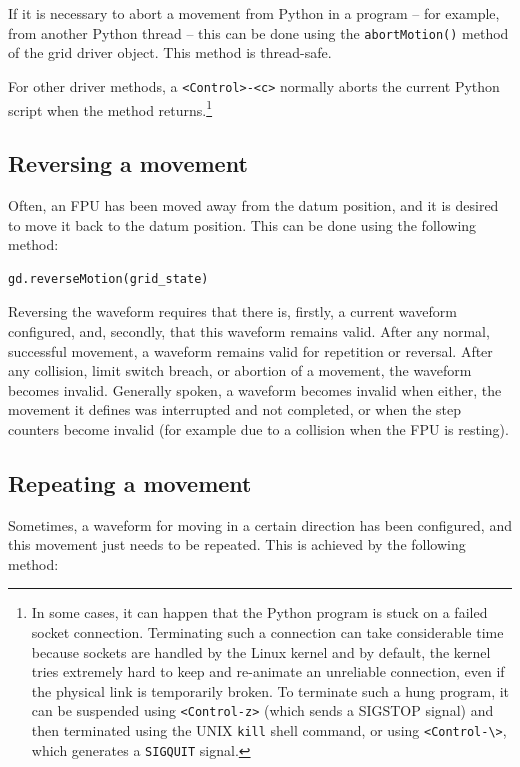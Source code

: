 \documentclass[11pt,a4paper]{report}
\begin{document}
If it is necessary to abort a movement from Python in a program -- for
example, from another Python thread -- this can be done using the
\texttt{abortMotion()} method of the grid driver object.  This method
is thread-safe.

For other driver methods, a \verb+<Control>-<c>+ normally aborts the
current Python script when the method returns.\footnote{
  In some cases, it
  can happen that the Python program is stuck on a failed socket
  connection. Terminating such a connection can take considerable time
  because sockets are handled by the Linux kernel and by default, the
  kernel tries extremely hard to keep and re-animate an unreliable
  connection, even if the physical link is temporarily broken. To
  terminate such a hung program, it can be suspended using
  \texttt{<Control-z>} (which sends a SIGSTOP signal) and then
  terminated using the UNIX \texttt{kill} shell command, or using
  \texttt{<Control-\textbackslash>}, which generates a
  \texttt{SIGQUIT} signal.}


\subsection{Reversing a movement}
Often, an FPU has been moved away from the datum position, and it is
desired to move it back to the datum position.  This can be done using
the following method:

\begin{verbatim}
gd.reverseMotion(grid_state)
\end{verbatim}

Reversing the waveform requires that there is, firstly, a current
waveform configured, and, secondly, that this waveform remains valid.
After any normal, successful movement, a waveform remains valid for
repetition or reversal. After any collision, limit switch breach, or
abortion of a movement, the waveform becomes invalid. Generally
spoken, a waveform becomes invalid when either, the movement it
defines was interrupted and not completed, or when the step counters
become invalid (for example due to a collision when the FPU is
resting).


\subsection{Repeating a movement}
Sometimes, a waveform for moving in a certain direction has been
configured, and this movement just needs to be repeated.  This is
achieved by the following method:
\end{document}
